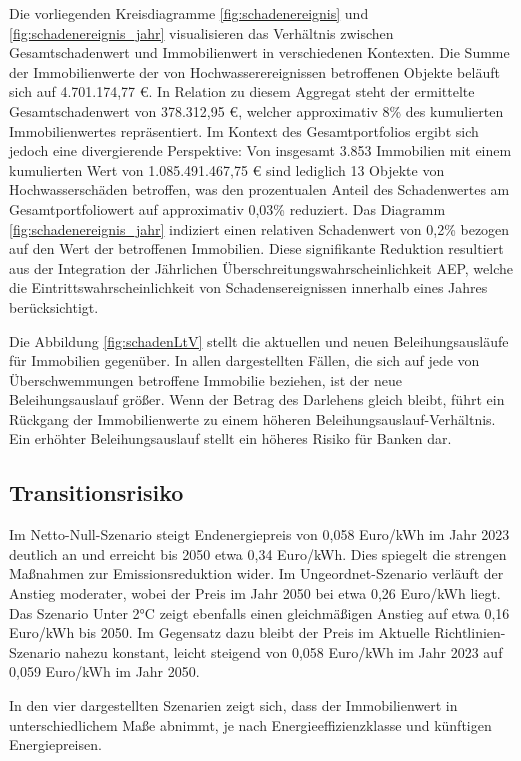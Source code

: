 Die vorliegenden Kreisdiagramme \ref{fig:schadenereignis} und \ref{fig:schadenereignis_jahr} visualisieren das Verhältnis zwischen Gesamtschadenwert und Immobilienwert in verschiedenen Kontexten. Die Summe der Immobilienwerte der von Hochwasserereignissen betroffenen Objekte beläuft sich auf 4.701.174,77 €. In Relation zu diesem Aggregat steht der ermittelte Gesamtschadenwert von 378.312,95 €, welcher approximativ 8\% des kumulierten Immobilienwertes repräsentiert. Im Kontext des Gesamtportfolios ergibt sich jedoch eine divergierende Perspektive: Von insgesamt 3.853 Immobilien mit einem kumulierten Wert von 1.085.491.467,75 € sind lediglich 13 Objekte von Hochwasserschäden betroffen, was den prozentualen Anteil des Schadenwertes am Gesamtportfoliowert auf approximativ 0,03\% reduziert. Das Diagramm \ref{fig:schadenereignis_jahr} indiziert einen relativen Schadenwert von 0,2\% bezogen auf den Wert der betroffenen Immobilien. Diese signifikante Reduktion resultiert aus der Integration der Jährlichen Überschreitungswahrscheinlichkeit \ac{AEP}, welche die Eintrittswahrscheinlichkeit von Schadensereignissen innerhalb eines Jahres berücksichtigt.

Die Abbildung \ref{fig:schadenLtV} stellt die aktuellen und neuen Beleihungsausläufe für Immobilien gegenüber. In allen dargestellten Fällen, die sich auf jede von Überschwemmungen betroffene Immobilie beziehen, ist der neue Beleihungsauslauf größer. Wenn der Betrag des Darlehens gleich bleibt, führt ein Rückgang der Immobilienwerte zu einem höheren Beleihungsauslauf-Verhältnis. Ein erhöhter Beleihungsauslauf stellt ein höheres Risiko für Banken dar.

\subsection{Transitionsrisiko}

Im Netto-Null-Szenario steigt Endenergiepreis von 0,058 Euro/kWh im Jahr 2023 deutlich an und erreicht bis 2050 etwa 0,34 Euro/kWh. Dies spiegelt die strengen Maßnahmen zur Emissionsreduktion wider. Im Ungeordnet-Szenario verläuft der Anstieg moderater, wobei der Preis im Jahr 2050 bei etwa 0,26 Euro/kWh liegt. Das Szenario Unter 2°C zeigt ebenfalls einen gleichmäßigen Anstieg auf etwa 0,16 Euro/kWh bis 2050. Im Gegensatz dazu bleibt der Preis im Aktuelle Richtlinien-Szenario nahezu konstant, leicht steigend von 0,058 Euro/kWh im Jahr 2023 auf 0,059 Euro/kWh im Jahr 2050.

In den vier dargestellten Szenarien zeigt sich, dass der Immobilienwert in unterschiedlichem Maße abnimmt, je nach Energieeffizienzklasse und künftigen Energiepreisen. 

